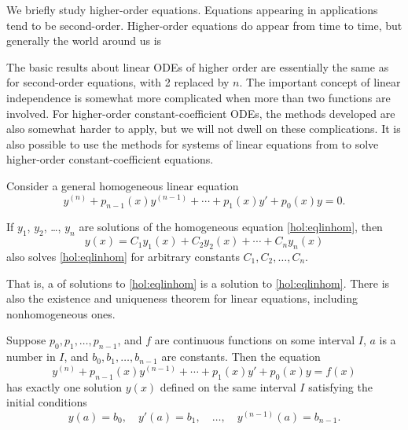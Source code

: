 
%

We briefly study higher-order equations.
Equations appearing in applications tend to be second-order.
Higher-order equations do appear from time to time, but
generally the world around us is   

The basic results about linear ODEs of higher order are essentially 
the same as for second-order equations, with 2 replaced by $n$.
The important concept
of linear independence is somewhat more complicated when more than two
functions are involved.
For higher-order constant-coefficient ODEs, the methods developed are also
somewhat harder to apply,
but we will not dwell on these complications.
It is also possible to use the methods for systems
of linear equations from  to solve higher-order
constant-coefficient equations.

Consider a general homogeneous linear equation
\begin{equation} \label{hol:eqlinhom}
y^{(n)} + p_{n-1}(x)y^{(n-1)} + \cdots + p_1(x) y' + p_0(x) y = 0 .
\end{equation}

\begin{theorem}[Superposition]
If $y_1$, $y_2$, \ldots, $y_n$ are solutions of the
homogeneous equation \eqref{hol:eqlinhom}, then 
\begin{equation*}
y(x) = C_1 y_1(x) + C_2 y_2(x) + \cdots + C_n y_n(x) 
\end{equation*}
also solves \eqref{hol:eqlinhom}
for arbitrary constants $C_1, C_2, \ldots, C_n$.
\end{theorem}

That is, a \emph{} of solutions
to \eqref{hol:eqlinhom}
is a solution to \eqref{hol:eqlinhom}.
There is also the existence and uniqueness theorem for linear
equations, including nonhomogeneous ones.

\begin{theorem}
Suppose $p_0, p_1, \ldots, p_{n-1}$, and $f$ are continuous functions
on some interval $I$,
$a$ is a number in $I$,
and $b_0, b_1, \ldots, b_{n-1}$ are constants.
Then the equation
\begin{equation*} %
y^{(n)} + p_{n-1}(x)y^{(n-1)} + \cdots + p_1(x) y' + p_0(x) y = f(x) 
\end{equation*}
has exactly one solution $y(x)$ defined on the same interval $I$
satisfying the initial conditions
\begin{equation*}
y(a) = b_0, \quad y'(a) = b_1, \quad \ldots, \quad y^{(n-1)}(a) = b_{n-1} .
\end{equation*}
\end{theorem}

